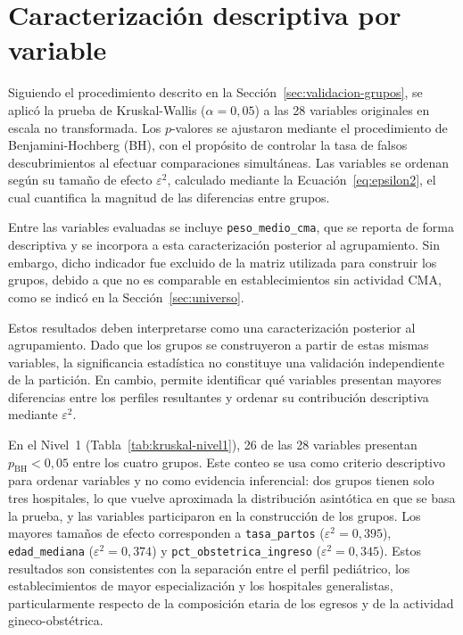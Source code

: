 \section{Caracterización descriptiva por variable}
\label{sec:res-validacion}

Siguiendo el procedimiento descrito en la Sección~\ref{sec:validacion-grupos},
se aplicó la prueba de Kruskal-Wallis ($\alpha=0{,}05$) a las 28 variables
originales en escala no transformada. Los $p$-valores se ajustaron mediante el
procedimiento de Benjamini-Hochberg (BH), con el propósito de controlar la tasa
de falsos descubrimientos al efectuar comparaciones simultáneas. Las variables
se ordenan según su tamaño de efecto $\varepsilon^2$, calculado mediante la
Ecuación~\ref{eq:epsilon2}, el cual cuantifica la magnitud de las diferencias
entre grupos.

Entre las variables evaluadas se incluye \texttt{peso\_medio\_cma}, que se
reporta de forma descriptiva y se incorpora a esta caracterización posterior al
agrupamiento. Sin embargo, dicho indicador fue excluido de la matriz utilizada
para construir los grupos, debido a que no es comparable en establecimientos
sin actividad CMA, como se indicó en la Sección~\ref{sec:universo}.

Estos resultados deben interpretarse como una caracterización posterior al
agrupamiento. Dado que los grupos se construyeron a partir de estas mismas
variables, la significancia estadística no constituye una validación
independiente de la partición. En cambio, permite identificar qué variables
presentan mayores diferencias entre los perfiles resultantes y ordenar su
contribución descriptiva mediante $\varepsilon^2$.

En el Nivel~1 (Tabla~\ref{tab:kruskal-nivel1}), 26 de las 28 variables
presentan $p_{\text{BH}}<0{,}05$ entre los cuatro grupos. Este conteo se usa
como criterio descriptivo para ordenar variables y no como evidencia
inferencial: dos grupos tienen solo tres hospitales, lo que vuelve aproximada
la distribución asintótica en que se basa la prueba, y las variables
participaron en la construcción de los grupos. Los mayores tamaños de efecto corresponden a \texttt{tasa\_partos}
($\varepsilon^2=0{,}395$), \texttt{edad\_mediana}
($\varepsilon^2=0{,}374$) y \texttt{pct\_obstetrica\_ingreso}
($\varepsilon^2=0{,}345$). Estos resultados son consistentes con la separación
entre el perfil pediátrico, los establecimientos de mayor especialización y los
hospitales generalistas, particularmente respecto de la composición etaria de
los egresos y de la actividad gineco-obstétrica.

